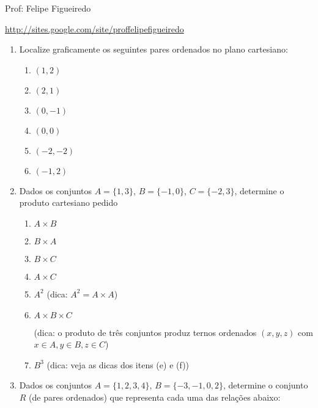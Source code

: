 \documentclass[a4paper]{article}
\begin{document}
\parbox[c]{.825\textwidth}{\raggedright%
{Prof: Felipe Figueiredo\par}
{\url{http://sites.google.com/site/proffelipefigueiredo}}

\vspace{1cm}
}


\begin{enumerate}
\item Localize graficamente os seguintes pares ordenados no plano
  cartesiano:
  \begin{enumerate}
  \item $(1,2)$
  \item $(2,1)$
  \item $(0,-1)$
  \item $(0,0)$
  \item $(-2,-2)$
  \item $(-1,2)$
  \end{enumerate}

\item Dados os conjuntos $A=\{1,3\}$, $B=\{-1,0\}$,
  $C=\{-2,3\}$, determine o produto cartesiano pedido
  \begin{enumerate}
  \item $A \times B$
  \item $B \times A$
  \item $B \times C$
  \item $A \times C$
  \item $A^2$ (dica: $A^2 = A \times A$)
  \item $A \times B \times C$ 

    (dica: o produto de três conjuntos produz ternos ordenados
    $(x,y,z)$ com $x \in A, y \in B, z \in C$)

  \item $B^3$ (dica: veja as dicas dos itens (e) e (f))
  \end{enumerate}

\item Dados os conjuntos $A=\{1,2,3,4\}$, $B=\{-3,-1,0,2\}$, determine
  o conjunto $R$ (de pares ordenados) que representa cada uma das
  relações abaixo:


\end{enumerate}
\end{document}

